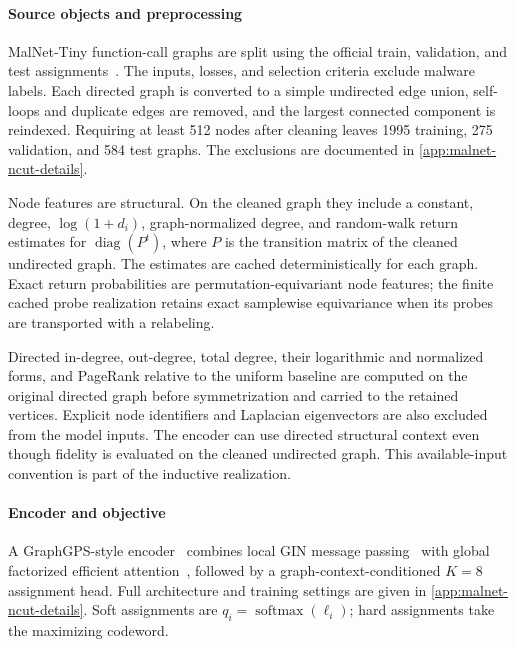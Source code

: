 \paragraph{Source objects and preprocessing}
MalNet-Tiny function-call graphs are split using the official train, validation, and test assignments~\citep{freitas2021large}.
The inputs, losses, and selection criteria exclude malware labels.
Each directed graph is converted to a simple undirected edge union, self-loops and duplicate edges are removed, and the largest connected component is reindexed.
Requiring at least 512 nodes after cleaning leaves 1995 training, 275 validation, and 584 test graphs.
The exclusions are documented in \ref{app:malnet-ncut-details}.

Node features are structural.
On the cleaned graph they include a constant, degree, $\log(1+d_i)$, graph-normalized degree, and random-walk return estimates for $\operatorname{diag}(P^t)$, where $P$ is the transition matrix of the cleaned undirected graph.
The estimates are cached deterministically for each graph.
Exact return probabilities are permutation-equivariant node features; the finite cached probe realization retains exact samplewise equivariance when its probes are transported with a relabeling.

Directed in-degree, out-degree, total degree, their logarithmic and normalized forms, and PageRank relative to the uniform baseline are computed on the original directed graph before symmetrization and carried to the retained vertices.
Explicit node identifiers and Laplacian eigenvectors are also excluded from the model inputs.
The encoder can use directed structural context even though fidelity is evaluated on the cleaned undirected graph.
This available-input convention is part of the inductive realization.

\paragraph{Encoder and objective}
A GraphGPS-style encoder~\citep{rampasek2022recipe} combines local GIN message passing~\citep{xu2019powerful} with global factorized efficient attention~\citep{shen2021efficient}, followed by a graph-context-conditioned $K=8$ assignment head.
Full architecture and training settings are given in \ref{app:malnet-ncut-details}.
Soft assignments are $q_i=\operatorname{softmax}(\ell_i)$; hard assignments take the maximizing codeword.

